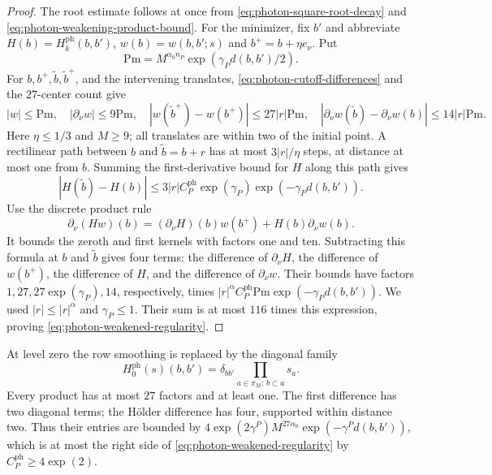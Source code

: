 \documentclass[11pt,letterpaper,reqno]{amsart}
\begin{document}
\begin{proof}
The root estimate follows at once from
\eqref{eq:photon-square-root-decay} and
\eqref{eq:photon-weakening-product-bound}.
For the minimizer, fix $b'$ and abbreviate
$H(b)=H_k^{\mathrm{ph}}(b,b')$, $w(b)=w(b,b';s)$ and
$b^+=b+\eta e_\nu$. Put
\[
 \mathrm{Pm}=M^{\alpha_0n_P}\exp(\gamma_Pd(b,b')/2).
\]
For $b,b^+,\tilde b,\tilde b^+$, and the intervening translates,
\eqref{eq:photon-cutoff-differences} and the $27$-center count
give
\[
 |w|\le\mathrm{Pm},\quad |\partial_\nu w|\le9\mathrm{Pm},\quad
 |w(\tilde b^+)-w(b^+)|\le27|r|\mathrm{Pm},\quad
 |\partial_\nu w(\tilde b)-\partial_\nu w(b)|
                                             \le14|r|\mathrm{Pm}.
\]
Here $\eta\le1/3$ and $M\ge9$; all translates are within two
of the initial point. A rectilinear path between $b$ and
$\tilde b=b+r$ has at most $3|r|/\eta$ steps, at distance at
most one from $b$. Summing the first-derivative bound for $H$
along this path gives
\[
 |H(\tilde b)-H(b)|
       \le3|r|C_P^{\mathrm{ph}}\exp(\gamma_P)\exp(-\gamma_Pd(b,b')).
\]
Use the discrete product rule
\[
 \partial_\nu(Hw)(b)
             =(\partial_\nu H)(b)w(b^+)+H(b)\partial_\nu w(b).
\]
It bounds the zeroth and first kernels with factors one and ten.
Subtracting this formula at $b$ and $\tilde b$ gives four terms:
the difference of $\partial_\nu H$, the difference of $w(b^+)$,
the difference of $H$, and the difference of $\partial_\nu w$.
Their bounds have factors $1,27,27\exp(\gamma_P),14$, respectively,
times
$|r|^\alpha C_P^{\mathrm{ph}}\mathrm{Pm}\exp(-\gamma_Pd(b,b'))$.
We used $|r|\le|r|^\alpha$ and $\gamma_P\le1$.
Their sum is at most $116$ times this expression, proving
\eqref{eq:photon-weakened-regularity}.
\end{proof}

At level zero the row smoothing is replaced by the diagonal
family
\begin{equation}\label{eq:photon-weakened-level-zero}
 H_0^{\mathrm{ph}}(s)(b,b')
               =\delta_{bb'}\prod_{a\in\pi_M:\,b\subset a}s_a.
\end{equation}
Every product has at most $27$ factors and at least one. The
first difference has two diagonal terms; the H\"older difference
has four, supported within distance two. Thus their entries are
bounded by $4\exp(2\gamma^P)M^{27\alpha_0}
\exp(-\gamma^Pd(b,b'))$, which is at most the right side of
\eqref{eq:photon-weakened-regularity} by $C_P^{\mathrm{ph}}\ge4\exp(2)$.
\end{document}
